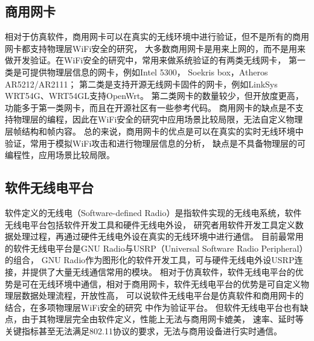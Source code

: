 		\subsection{商用网卡}
		相对于仿真软件，商用网卡可以在真实的无线环境中进行验证，但不是所有的商用网卡都支持物理层WiFi安全的研究，
		大多数商用网卡是用来上网的，而不是用来做开发验证。在WiFi安全的研究中，常用来做系统验证的有两类无线网卡，
		第一类是可提供物理层信息的网卡，例如Intel 5300\cite{ccs16csi, wisec14violating, acsac15iot}，
		Soekris box\cite{mobicom13securearray}，Atheros AR5212/AR2111\cite{mobicom08radiometric}；
		第二类是支持开源无线网卡固件的网卡，例如LinkSys WRT54G\cite{wisec06spoofing}、WRT54GL\cite{iet13multilayer}支持OpenWrt。
		第二类网卡的数量较少，但开放度更高，功能多于第一类网卡，而且在开源社区有一些参考代码。
		商用网卡的缺点是不支持物理层的编程，因此在WiFi安全的研究中应用场景比较局限，无法自定义物理层帧结构和帧内容。
		总的来说，商用网卡的优点是可以在真实的实时无线环境中验证，常用于模拟WiFi攻击和进行物理层信息的分析，
		缺点是不具备物理层的可编程性，应用场景比较局限。

		\subsection{软件无线电平台}
		软件定义的无线电（Software-defined Radio）是指软件实现的无线电系统，软件无线电平台包括软件开发工具和硬件无线电外设，
		研究者用软件开发工具定义数据处理过程，再通过硬件无线电外设在真实的无线环境中进行通信。
		目前最常用的软件无线电平台是GNU Radio\cite{gnuradio}与USRP（Universal Software Radio Peripheral）\cite{ettus09usrp}的组合，
		GNU Radio作为图形化的软件开发工具，可与硬件无线电外设USRP连接，并提供了大量无线通信常用的模块。
		相对于仿真软件，软件无线电平台的优势是可在无线环境中通信，相对于商用网卡，软件无线电平台的优势是可自定义物理层数据处理流程，开放性高，
		可以说软件无线电平台是仿真软件和商用网卡的结合，在多项物理层WiFi安全的研究
		\cite{ccs16mumimo, cns15injection, globecom14location, tvt16spoofing}中作为验证平台。
		但软件无线电平台也有缺点，由于其物理层完全由软件定义，性能上无法与商用网卡媲美，
		速率、延时等关键指标甚至无法满足802.11协议的要求，无法与商用设备进行实时通信。

